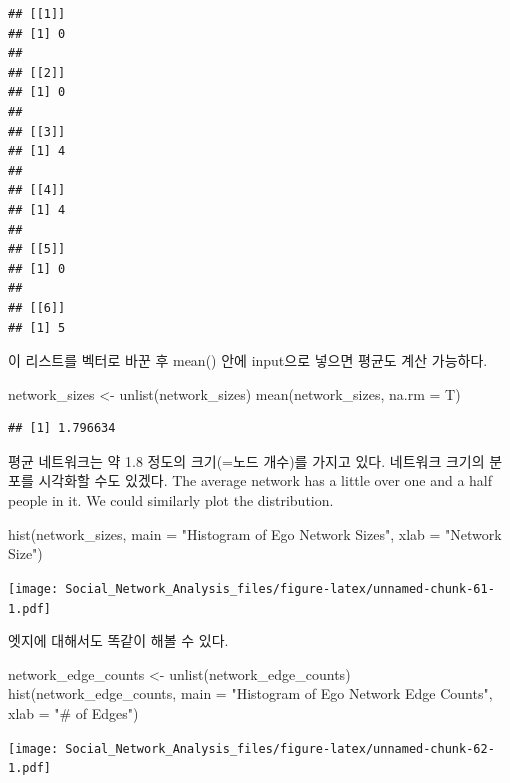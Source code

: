 \documentclass[
]{book}
\newenvironment{Shaded}{\begin{snugshade}}{\end{snugshade}}
\newcommand{\AttributeTok}[1]{\textcolor[rgb]{0.77,0.63,0.00}{#1}}
\newcommand{\FunctionTok}[1]{\textcolor[rgb]{0.00,0.00,0.00}{#1}}
\newcommand{\NormalTok}[1]{#1}
\newcommand{\OtherTok}[1]{\textcolor[rgb]{0.56,0.35,0.01}{#1}}
\newcommand{\StringTok}[1]{\textcolor[rgb]{0.31,0.60,0.02}{#1}}
\begin{document}
\begin{verbatim}
## [[1]]
## [1] 0
## 
## [[2]]
## [1] 0
## 
## [[3]]
## [1] 4
## 
## [[4]]
## [1] 4
## 
## [[5]]
## [1] 0
## 
## [[6]]
## [1] 5
\end{verbatim}

이 리스트를 벡터로 바꾼 후 mean() 안에 input으로 넣으면 평균도 계산 가능하다.

\begin{Shaded}
\begin{Highlighting}[]
\NormalTok{network\_sizes }\OtherTok{\textless{}{-}} \FunctionTok{unlist}\NormalTok{(network\_sizes)}
\FunctionTok{mean}\NormalTok{(network\_sizes, }\AttributeTok{na.rm =}\NormalTok{ T)}
\end{Highlighting}
\end{Shaded}

\begin{verbatim}
## [1] 1.796634
\end{verbatim}

평균 네트워크는 약 1.8 정도의 크기(=노드 개수)를 가지고 있다. 네트워크 크기의 분포를 시각화할 수도 있겠다.
The average network has a little over one and a half people in it. We could similarly plot the distribution.

\begin{Shaded}
\begin{Highlighting}[]
\FunctionTok{hist}\NormalTok{(network\_sizes, }\AttributeTok{main =} \StringTok{"Histogram of Ego Network Sizes"}\NormalTok{, }\AttributeTok{xlab =} \StringTok{"Network Size"}\NormalTok{)}
\end{Highlighting}
\end{Shaded}

\texttt{[image: Social\_Network\_Analysis\_files/figure-latex/unnamed-chunk-61-1.pdf]}

엣지에 대해서도 똑같이 해볼 수 있다.

\begin{Shaded}
\begin{Highlighting}[]
\NormalTok{network\_edge\_counts }\OtherTok{\textless{}{-}} \FunctionTok{unlist}\NormalTok{(network\_edge\_counts)}
\FunctionTok{hist}\NormalTok{(network\_edge\_counts, }\AttributeTok{main =} \StringTok{"Histogram of Ego Network Edge Counts"}\NormalTok{, }\AttributeTok{xlab =} \StringTok{"\# of Edges"}\NormalTok{)}
\end{Highlighting}
\end{Shaded}

\texttt{[image: Social\_Network\_Analysis\_files/figure-latex/unnamed-chunk-62-1.pdf]}
\end{document}
